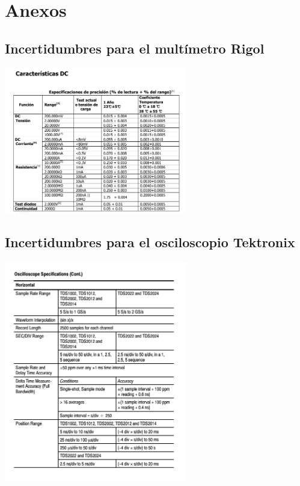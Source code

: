\documentclass[DIV=calc, paper=a4, fontsize=11pt]{scrartcl}
\newenvironment{Figura}
  {\par\medskip\noindent\minipage{\linewidth}}
  {\endminipage\par\medskip}
\begin{document}
\section*{Anexos}








\subsection*{Incertidumbres para el multímetro Rigol}

\begin{Figura}
    \centering
    \includegraphics[width=0.6\textwidth]{incertidumbres multimetro rigol.PNG}
    \label{fig}
\end{Figura}



\subsection*{Incertidumbres para el osciloscopio Tektronix}

\begin{Figura}
    \centering
    \includegraphics[width=0.6\textwidth]{incertidumbres osciloscopio tektronix 1.PNG}
    \label{fig}
\end{Figura}
\end{document}
